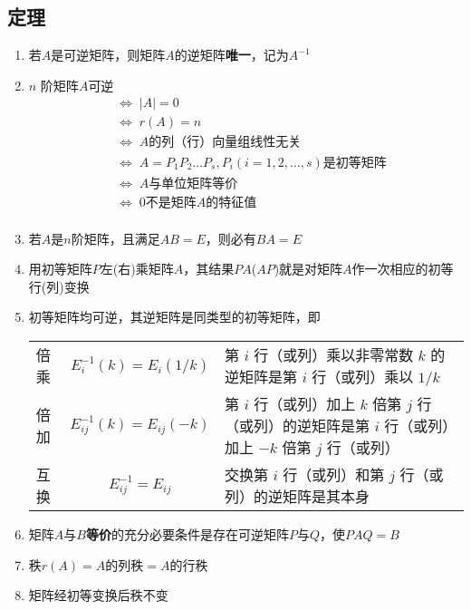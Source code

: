 \documentclass[a4paper,12pt]{article}
\begin{document}
    \subsection{定理}

    \begin{enumerate}
        \item 若$A$是可逆矩阵，则矩阵$A$的逆矩阵\textbf{唯一}，记为$A^{-1}$
        \item $n$ 阶矩阵$A$可逆
        \begin{align*}
            &\Leftrightarrow\; |A| = 0  \\
            &\Leftrightarrow\; r(A) = n  \\
            &\Leftrightarrow\; A \text{的列（行）向量组线性无关}  \\
            &\Leftrightarrow\; A = P_{1}P_{2}\dots P_{s}, P_{i}(i = 1,2,\dots,s)\text{是初等矩阵}  \\
            &\Leftrightarrow\; A \text{与单位矩阵等价}  \\
            &\Leftrightarrow\; 0\text{不是矩阵} A \text{的特征值}  \\
        \end{align*}
        \item 若$A$是$n$阶矩阵，且满足$AB = E$，则必有$BA = E$
        \item 用初等矩阵$P$左(右)乘矩阵$A$，其结果$PA$($AP$)就是对矩阵$A$作一次相应的初等行(列)变换
        \item 初等矩阵均可逆，其逆矩阵是同类型的初等矩阵，即

        \renewcommand{\arraystretch}{1.2}  %
        \begin{tabularx}{\textwidth}{l c >{\raggedright\arraybackslash}X}
            倍乘 & $E_i^{-1}(k) = E_i(1/k)$      & 第 $i$ 行（或列）乘以非零常数 $k$ 的逆矩阵是第 $i$ 行（或列）乘以 $1/k$                     \\
            倍加 & $E_{ij}^{-1}(k) = E_{ij}(-k)$ & 第 $i$ 行（或列）加上 $k$ 倍第 $j$ 行（或列）的逆矩阵是第 $i$ 行（或列）加上 $-k$ 倍第 $j$ 行（或列） \\
            互换 & $E_{ij}^{-1} = E_{ij}$        & 交换第 $i$ 行（或列）和第 $j$ 行（或列）的逆矩阵是其本身                                  \\
        \end{tabularx}
        \item 矩阵$A$与$B$\textbf{等价}的充分必要条件是存在可逆矩阵$P$与$Q$，使$PAQ = B$
        \item 秩$r(A) = A \text{的列秩} = A \text{的行秩}$
        \item 矩阵经初等变换后秩不变
    \end{enumerate}
\end{document}
